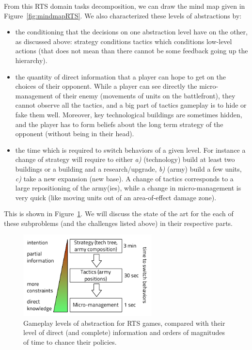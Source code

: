 From this RTS domain tasks decomposition, we can draw the mind map given in Figure~\ref{fig:mindmapRTS}. We also characterized these levels of abstractions by:
\begin{itemize}
    \item the conditioning that the decisions on one abstraction level have on the other, as discussed above: strategy conditions tactics which conditions low-level actions (that does not mean than there cannot be some feedback going up the hierarchy).
    \item the quantity of direct information that a player can hope to get on the choices of their opponent. While a player can see directly the micro-management of their enemy (movements of units on the battlefront), they cannot observe all the tactics, and a big part of tactics gameplay is to hide or fake them well. Moreover, key technological buildings are sometimes hidden, and the player has to form beliefs about the long term strategy of the opponent (without being in their head).
    \item the time which is required to switch behaviors of a given level. For instance a change of strategy will require to either \textit{a)} (technology) build at least two buildings or a building and a research/upgrade, \textit{b)} (army) build a few units, \textit{c)} take a new expansion (new base). A change of tactics corresponds to a large repositioning of the army(ies), while a change in micro-management is very quick (like moving units out of an area-of-effect damage zone).
\end{itemize}
This is shown in Figure~\ref{fig:sc_abstraction_times}. We will discuss the state of the art for the each of these subproblems (and the challenges listed above) in their respective parts.

\begin{figure}[htp]
\centerline{\includegraphics[width=7cm]{images/starcraft_levels_abstraction_light.pdf}}
\caption{Gameplay levels of abstraction for RTS games, compared with their level of direct (and complete) information and orders of magnitudes of time to chance their policies.}
\label{fig:sc_abstraction_times}
\end{figure}


